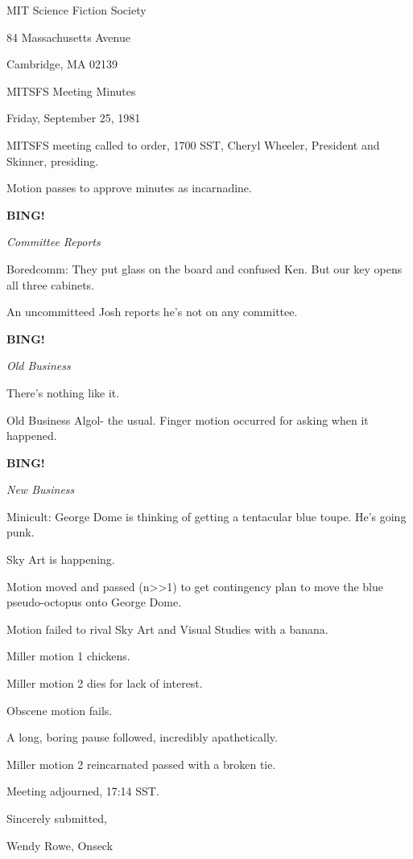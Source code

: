 \documentclass[12pt]{article}
\newcommand{\bing}{{\bf BING!} }
\newcommand{\goto}[1]{\bing \vskip 12pt \centerline{{\em{#1}}}}
\begin{document}
\begin{center}

MIT Science Fiction Society 

84 Massachusetts Avenue

Cambridge, MA 02139

\vspace{12pt}

MITSFS Meeting Minutes 

Friday, September 25, 1981

\end{center}
 
\vspace{18pt}

\setlength{\parskip}{6pt}

\noindent
MITSFS meeting called to order, 1700 SST,
Cheryl Wheeler, President and Skinner, presiding.

Motion passes to approve minutes as incarnadine.

\goto{Committee Reports}

Boredcomm: They put glass on the board and confused Ken. But our key opens all three cabinets.

An uncommitteed Josh reports he's not on any committee.

\goto{Old Business}

There's nothing like it.

Old Business Algol- the usual. Finger motion occurred for asking when it happened.

\goto{New Business}

Minicult: George Dome is thinking of getting a tentacular blue toupe. He's going punk.

Sky Art is happening.

Motion moved and passed (n>>1) to get contingency plan to move the blue pseudo-octopus onto George Dome.

Motion failed to rival Sky Art and Visual Studies with a banana.

Miller motion 1 chickens.

Miller motion 2 dies for lack of interest.

Obscene motion fails.

A long, boring pause followed, incredibly apathetically.

Miller motion 2 reincarnated passed with a broken tie.

\vspace{12pt}

\noindent
Meeting adjourned, 17:14 SST.

\vspace{18pt}

\centerline{Sincerely submitted,}
\centerline{Wendy Rowe, Onseck}
\end{document}

